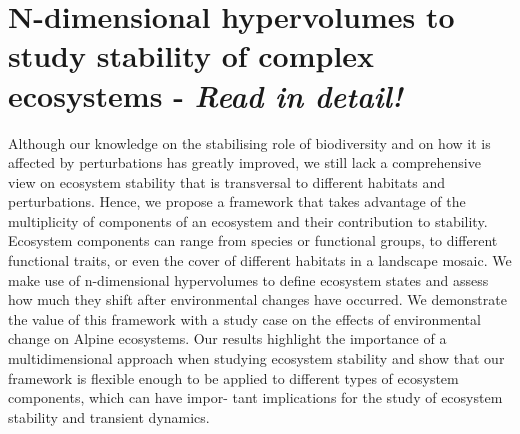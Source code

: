 \documentclass[11pt]{article}
\begin{document}
	
	\section*{N-dimensional hypervolumes to study stability of complex ecosystems \citep{Barros2016} - \textit{Read in detail!}}
	
	Although our knowledge on the stabilising role of biodiversity and on how it is affected by perturbations has greatly improved, we still lack a comprehensive view on ecosystem stability that is transversal to different habitats and perturbations. Hence, we propose a framework that takes advantage of the multiplicity of components of an ecosystem and their contribution to stability. Ecosystem components can range from species or functional groups, to different functional traits, or even the cover of different habitats in a landscape mosaic. We make use of n-dimensional hypervolumes to define ecosystem states and assess how much they shift after environmental changes have occurred. We demonstrate the value of this framework with a study case on the effects of environmental change on Alpine ecosystems. Our results highlight the importance of a multidimensional approach when studying ecosystem stability and show that our framework is flexible enough to be applied to different types of ecosystem components, which can have impor- tant implications for the study of ecosystem stability and transient dynamics.
	
\end{document}
